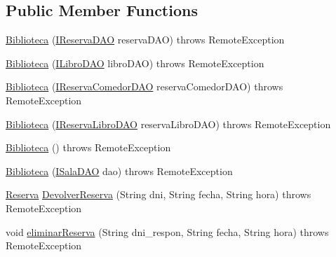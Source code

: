 \subsection*{Public Member Functions}
\begin{DoxyCompactItemize}
\item 
\mbox{\hyperlink{classes_1_1deusto_1_1spq_1_1biblioteca_1_1remote_1_1_biblioteca_aac92372698896371d05bc2c52d0310b6}{Biblioteca}} (\mbox{\hyperlink{interfacees_1_1deusto_1_1spq_1_1biblioteca_1_1dao_1_1_i_reserva_d_a_o}{I\+Reserva\+D\+AO}} reserva\+D\+AO)  throws Remote\+Exception 
\item 
\mbox{\hyperlink{classes_1_1deusto_1_1spq_1_1biblioteca_1_1remote_1_1_biblioteca_ab4338bb1554332800dfbbcf7902dbf44}{Biblioteca}} (\mbox{\hyperlink{interfacees_1_1deusto_1_1spq_1_1biblioteca_1_1dao_1_1_i_libro_d_a_o}{I\+Libro\+D\+AO}} libro\+D\+AO)  throws Remote\+Exception 
\item 
\mbox{\hyperlink{classes_1_1deusto_1_1spq_1_1biblioteca_1_1remote_1_1_biblioteca_a29f192a64569bf082dde82af27edf39c}{Biblioteca}} (\mbox{\hyperlink{interfacees_1_1deusto_1_1spq_1_1biblioteca_1_1dao_1_1_i_reserva_comedor_d_a_o}{I\+Reserva\+Comedor\+D\+AO}} reserva\+Comedor\+D\+AO)  throws Remote\+Exception 
\item 
\mbox{\hyperlink{classes_1_1deusto_1_1spq_1_1biblioteca_1_1remote_1_1_biblioteca_a4cb3ca9ddffe231e18430b4b5748311f}{Biblioteca}} (\mbox{\hyperlink{interfacees_1_1deusto_1_1spq_1_1biblioteca_1_1dao_1_1_i_reserva_libro_d_a_o}{I\+Reserva\+Libro\+D\+AO}} reserva\+Libro\+D\+AO)  throws Remote\+Exception 
\item 
\mbox{\hyperlink{classes_1_1deusto_1_1spq_1_1biblioteca_1_1remote_1_1_biblioteca_ad55e6c6c3194462548c1a54da01fa99c}{Biblioteca}} ()  throws Remote\+Exception 
\item 
\mbox{\hyperlink{classes_1_1deusto_1_1spq_1_1biblioteca_1_1remote_1_1_biblioteca_a3efbf1f8ead1446d8d37945a4dfb7086}{Biblioteca}} (\mbox{\hyperlink{interfacees_1_1deusto_1_1spq_1_1biblioteca_1_1dao_1_1_i_sala_d_a_o}{I\+Sala\+D\+AO}} dao)  throws Remote\+Exception 
\item 
\mbox{\hyperlink{classes_1_1deusto_1_1spq_1_1biblioteca_1_1data_1_1_reserva}{Reserva}} \mbox{\hyperlink{classes_1_1deusto_1_1spq_1_1biblioteca_1_1remote_1_1_biblioteca_ac1f6d54dda74f91519d3d6cbc86b35d6}{Devolver\+Reserva}} (String dni, String fecha, String hora)  throws Remote\+Exception 
\item 
void \mbox{\hyperlink{classes_1_1deusto_1_1spq_1_1biblioteca_1_1remote_1_1_biblioteca_a99ad677b2d619ad4b0560daa40f351db}{eliminar\+Reserva}} (String dni\+\_\+respon, String fecha, String hora)  throws Remote\+Exception 

\end{DoxyCompactItemize}
